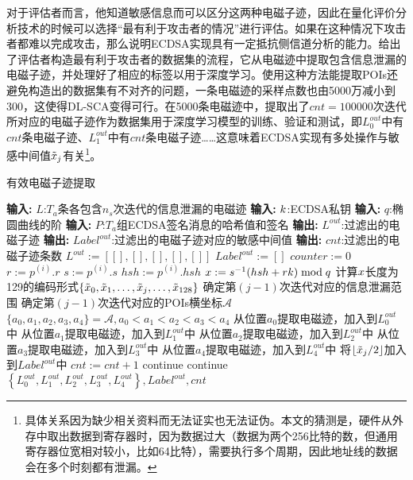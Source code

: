 {{	对于评估者而言，他知道敏感信息而可以区分这两种电磁子迹，因此在量化评价分析技术的时候可以选择“最有利于攻击者的情况”进行评估。如果在这种情况下攻击者都难以完成攻击，那么说明ECDSA实现具有一定抵抗侧信道分析的能力。给出了评估者构造最有利于攻击者的数据集的流程，它从电磁迹中提取包含信息泄漏的电磁子迹，并处理好了相应的标签以用于深度学习。使用这种方法能提取POIs还避免构造出的数据集有不对齐的问题，一条电磁迹的采样点数也由5000万减小到300，这使得DL-SCA变得可行。在5000条电磁迹中，提取出了$cnt=100000$次迭代所对应的电磁子迹作为数据集用于深度学习模型的训练、验证和测试，即$L_0^{out}$中有$cnt$条电磁子迹、$L_1^{out}$中有$cnt$条电磁子迹……这意味着ECDSA实现有多处操作与敏感中间值$\tilde {x}_j$有关\footnote{具体关系因为缺少相关资料而无法证实也无法证伪。本文的猜测是，硬件从外存中取出数据到寄存器时，因为数据过大（数据为两个256比特的数，但通用寄存器位宽相对较小，比如64比特），需要执行多个周期，因此地址线的数据会在多个时刻都有泄漏。}。
	
	\begin{breakablealgorithm}
		\caption{有效电磁子迹提取}\label{alg:filter}
		\begin{algorithmic}[1]
			\Statex \textbf{输入:} $L$:$T_a$条各包含$n_s$次迭代的信息泄漏的电磁迹
			\Statex \textbf{输入:} $k$:ECDSA私钥
			\Statex \textbf{输入:} $q$:椭圆曲线的阶
			\Statex \textbf{输入:} $P$:$T_a$组ECDSA签名消息的哈希值和签名
			\Statex \textbf{输出:} $L^{out}$:过滤出的电磁子迹
			\Statex \textbf{输出:} $Label^{out}$:过滤出的电磁子迹对应的敏感中间值
			\Statex \textbf{输出:} $cnt$:过滤出的电磁子迹条数
			\State $L^{out}:=\left[ [],[],[],[],[]\right] $
			\State $Label^{out}:=[]$
			\State $counter:=0$
				\State $r:=p^{(i)}.r$
				\State $s:=p^{(i)}.s$
				\State $hsh:=p^{(i)}.hsh$
				\State $x:=s^{-1}(hsh+rk)\bmod q$
				\State 计算$x$长度为129的编码形式$\left\{\tilde{x}_0,\tilde{x}_1,\dots,\tilde{x}_j,\dots, \tilde{x}_{128}\right\}$
						\State 确定第$(j-1)$次迭代对应的信息泄漏范围
						\State 确定第$(j-1)$次迭代对应的POIs横坐标$\mathcal A$
							\State $\{a_0,a_1,a_2,a_3,a_4\}=\mathcal A,a_0<a_1<a_2<a_3<a_4$
							\State 从位置$a_0$提取电磁迹，加入到$L_0^{out}$中
							\State 从位置$a_1$提取电磁迹，加入到$L_1^{out}$中
							\State 从位置$a_2$提取电磁迹，加入到$L_2^{out}$中
							\State 从位置$a_3$提取电磁迹，加入到$L_3^{out}$中
							\State 从位置$a_4$提取电磁迹，加入到$L_4^{out}$中
							\State 将$\left\lfloor\tilde{x}_j/2\right\rfloor$加入到$Label^{out}$中
							\State $cnt:=cnt+1$
						\Else
							\State continue
						\EndIf
					\Else
						\State continue
					\EndIf
				\EndFor
			\EndFor
			\State \Return $\left\lbrace L_0^{out},L_1^{out},L_2^{out},L_3^{out},L_4^{out}\right\rbrace,Label^{out},cnt $
		\end{algorithmic}
	\end{breakablealgorithm}
	
}}
